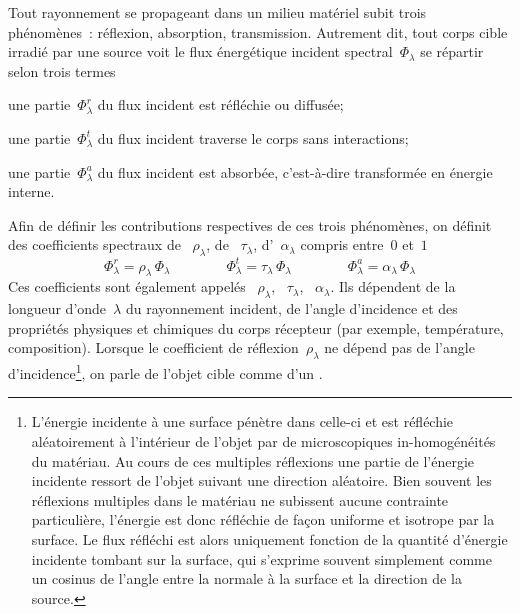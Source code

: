 \sk
Tout rayonnement se propageant dans un milieu matériel subit trois phénomènes~: réflexion, absorption, transmission. Autrement dit, tout corps cible irradié par une source voit le flux énergétique incident spectral~$\Phi_{\lambda}$ se répartir selon trois termes
\begin{citemize}
\item une partie~$\Phi_{\lambda}^r$ du flux incident est réfléchie ou diffusée;
\item une partie~$\Phi_{\lambda}^t$ du flux incident traverse le corps sans interactions;
\item une partie~$\Phi_{\lambda}^a$ du flux incident est absorbée, c'est-à-dire transformée en énergie interne.
\end{citemize}
Afin de définir les contributions respectives de ces trois phénomènes, on définit des coefficients spectraux de ~$\rho_{\lambda}$, de ~$\tau_{\lambda}$, d'~$\alpha_{\lambda}$ compris entre~$0$ et~$1$
$$\Phi_{\lambda}^r = \rho_{\lambda} \, \Phi_{\lambda} \qquad\qquad \Phi_{\lambda}^t = \tau_{\lambda} \, \Phi_{\lambda} \qquad\qquad \Phi_{\lambda}^a = \alpha_{\lambda} \, \Phi_{\lambda}$$
Ces coefficients sont également appelés ~$\rho_{\lambda}$, ~$\tau_{\lambda}$, ~$\alpha_{\lambda}$. Ils dépendent de la longueur d'onde~$\lambda$ du rayonnement incident, de l'angle d'incidence et des propriétés physiques et chimiques du corps récepteur (par exemple, température, composition). Lorsque le coefficient de réflexion~$\rho_{\lambda}$ ne dépend pas de l'angle d'incidence\footnote{L'énergie incidente à une surface pénètre dans celle-ci et est réfléchie aléatoirement à l'intérieur de l'objet par de microscopiques in-homogénéités du matériau. Au cours de ces multiples réflexions une partie de l'énergie incidente ressort de l'objet suivant une direction aléatoire. Bien souvent les réflexions multiples dans le matériau ne subissent aucune contrainte particulière, l'énergie est donc réfléchie de façon uniforme et isotrope par la surface. Le flux réfléchi est alors uniquement fonction de la quantité d'énergie incidente tombant sur la surface, qui s'exprime souvent simplement comme un cosinus de l'angle entre la normale à la surface et la direction de la source.}, on parle de l'objet cible comme d'un . 

